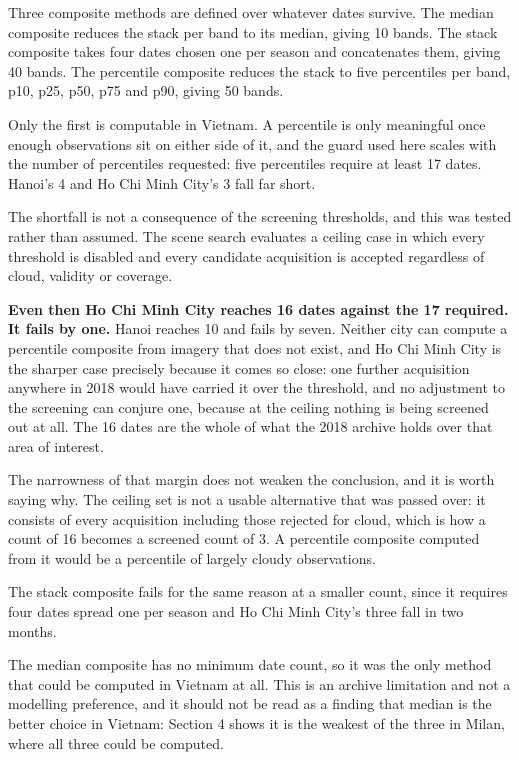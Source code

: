 \documentclass[11pt,a4paper]{article}
\begin{document}
Three composite methods are defined over whatever dates survive. The median
composite reduces the stack per band to its median, giving 10 bands. The stack
composite takes four dates chosen one per season and concatenates them, giving
40 bands. The percentile composite reduces the stack to five percentiles per
band, p10, p25, p50, p75 and p90, giving 50 bands.

Only the first is computable in Vietnam. A percentile is only meaningful once
enough observations sit on either side of it, and the guard used here scales
with the number of percentiles requested: five percentiles require at least 17
dates. Hanoi's 4 and Ho Chi Minh City's 3 fall far short.

The shortfall is not a consequence of the screening thresholds, and this was
tested rather than assumed. The scene search evaluates a ceiling case in which
every threshold is disabled and every candidate acquisition is accepted
regardless of cloud, validity or coverage.

\textbf{Even then Ho Chi Minh City reaches 16 dates against the 17 required. It fails
by one.} Hanoi reaches 10 and fails by seven. Neither city can compute a
percentile composite from imagery that does not exist, and Ho Chi Minh City is
the sharper case precisely because it comes so close: one further acquisition
anywhere in 2018 would have carried it over the threshold, and no adjustment to
the screening can conjure one, because at the ceiling nothing is being screened
out at all. The 16 dates are the whole of what the 2018 archive holds over that
area of interest.

The narrowness of that margin does not weaken the conclusion, and it is worth
saying why. The ceiling set is not a usable alternative that was passed over: it
consists of every acquisition including those rejected for cloud, which is how a
count of 16 becomes a screened count of 3. A percentile composite computed from
it would be a percentile of largely cloudy observations.

The stack composite fails for the same reason at a smaller count, since it
requires four dates spread one per season and Ho Chi Minh City's three fall in
two months.

The median composite has no minimum date count, so it was the only method that
could be computed in Vietnam at all. This is an archive limitation and not a
modelling preference, and it should not be read as a finding that median is the
better choice in Vietnam: Section 4 shows it is the weakest of the three in
Milan, where all three could be computed.
\end{document}
